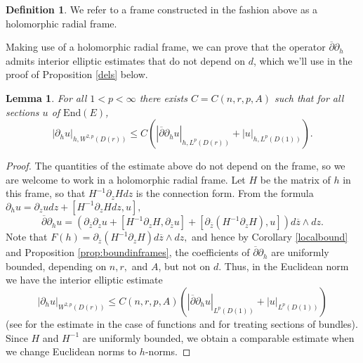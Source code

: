 \documentclass[10pt]{amsart}
\newtheorem{lem}[thm]{Lemma}
\theoremstyle{definition}
\newtheorem{defn}[thm]{Definition}
\begin{document}
\begin{defn}
   We refer to a frame constructed in the fashion above as a holomorphic radial frame.
\end{defn}


Making use of a holomorphic radial frame, we can prove that the operator $\overline{\partial}\partial_h$ admits interior elliptic estimates that do not depend on $d$, which we'll use in the proof of Proposition \ref{dels} below. 
\begin{lem}\label{lem: schauder estimate}
    For all $1<p<\infty$ there exists $C=C(n,r,p,A)$ such that for all sections $u$ of $\textrm{End}(E)$,
    $$|\partial_h u|_{h,W^{2,p}(D(r))}\leq C(|\overline{\partial}\partial_h u|_{h,L^p(D(r))}+| u|_{h,L^p(D(1))}).$$
\end{lem}
\begin{proof}
The quantities of the estimate above do not depend on the frame, so we are welcome to work in a holomorphic radial frame. Let $H$ be the matrix of $h$ in this frame, so that $H^{-1}\partial_z H dz$ is the connection form.
From the formula $\partial_h u = \partial_z u dz + [H^{-1}\partial_z H dz,u],$
\begin{equation}\label{eqn: laplacian for h}
    \overline{\partial}\partial_h u = (\partial_{\overline{z}}\partial_z u + [H^{-1}\partial_z H ,\partial_{\overline{z}}u]+[\partial_{\overline{z}}(H^{-1}\partial_z H ),u])d\overline{z}\wedge dz.
\end{equation}
Note that $F(h) = \partial_{\overline{z}}(H^{-1}\partial_z H)d\overline{z}\wedge dz,$ and hence by Corollary \ref{localbound} and Proposition \ref{prop:boundinframes}, the coefficients of $\overline{\partial}\partial_h$ are uniformly bounded, depending on $n,r,$ and $A$, but not on $d$.
 Thus, in the Euclidean norm we have the interior elliptic estimate
 $$|\partial_h u|_{W^{2,p}(D(r))}\leq C(n,r,p,A)(|\overline{\partial}\partial_h u|_{L^p(D(1))}+| u|_{L^p(D(1))})$$ (see \cite[Theorem 9.11]{GT} for the estimate in the case of functions and \cite[Theorem 10.33]{Ni} for treating sections of bundles). Since $H$ and $H^{-1}$ are uniformly bounded, we obtain a comparable estimate when we change Euclidean norms to $h$-norms.
\end{proof}
\end{document}
